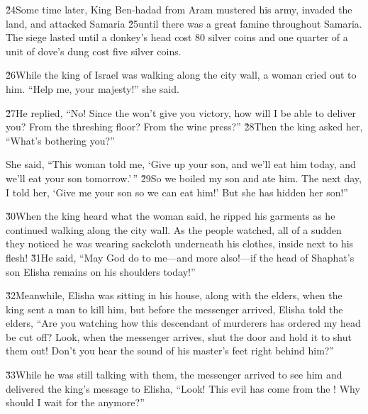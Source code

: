 \v{24}Some time later, King Ben-hadad from Aram mustered his army, invaded the land, and attacked Samaria \v{25}until there was a great famine throughout Samaria. The siege lasted until a donkey's head cost 80 silver coins and one quarter of a unit of dove's dung cost five silver coins.

\v{26}While the king of Israel was walking along the city wall, a woman cried out to him. ``Help me, your majesty!'' she said.

\v{27}He replied, ``No! Since the  won't give you victory, how will I be able to deliver you? From the threshing floor? From the wine press?'' \v{28}Then the king asked her, ``What's bothering you?''

She said, ``This woman told me, `Give up your son, and we'll eat him today, and we'll eat your son tomorrow.'\,'' \v{29}So we boiled my son and ate him. The next day, I told her, `Give me your son so we can eat him!' But she has hidden her son!''

\v{30}When the king heard what the woman said, he ripped his garments as he continued walking along the city wall. As the people watched, all of a sudden they noticed he was wearing sackcloth underneath his clothes, inside next to his flesh! \v{31}He said, ``May God do to me---and more also!---if the head of Shaphat's son Elisha remains on his shoulders today!''

\v{32}Meanwhile, Elisha was sitting in his house, along with the elders, when the king sent a man to kill him, but before the messenger arrived, Elisha told the elders, ``Are you watching how this descendant of murderers has ordered my head be cut off? Look, when the messenger arrives, shut the door and hold it to shut them out! Don't you hear the sound of his master's feet right behind him?''

\v{33}While he was still talking with them, the messenger arrived to see him and delivered the king's message to Elisha, ``Look! This evil has come from the ! Why should I wait for the  anymore?''

